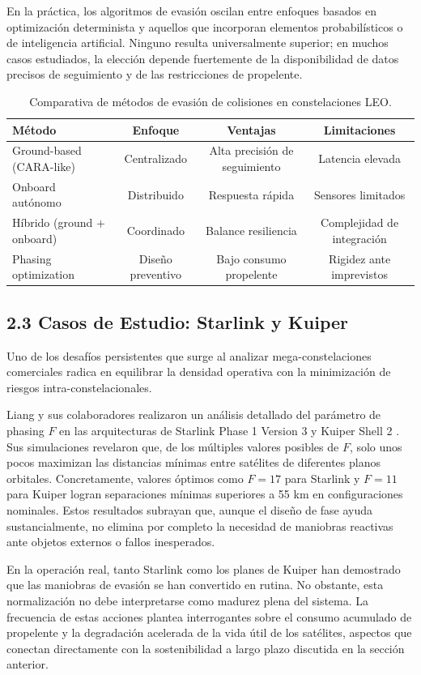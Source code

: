 En la práctica, los algoritmos de evasión oscilan entre enfoques basados en optimización determinista y aquellos que incorporan elementos probabilísticos o de inteligencia artificial. Ninguno resulta universalmente superior; en muchos casos estudiados, la elección depende fuertemente de la disponibilidad de datos precisos de seguimiento y de las restricciones de propelente.

\begin{table}[t]
\centering
\caption{Comparativa de métodos de evasión de colisiones en constelaciones LEO.}
\label{tab:comparativa_evasion}
\begin{tabular}{lccc}
\toprule
Método & Enfoque & Ventajas & Limitaciones \\
\midrule
Ground-based (CARA-like) & Centralizado & Alta precisión de seguimiento & Latencia elevada \\
Onboard autónomo & Distribuido & Respuesta rápida & Sensores limitados \\
Híbrido (ground + onboard) & Coordinado & Balance resiliencia & Complejidad de integración \\
Phasing optimization & Diseño preventivo & Bajo consumo propelente & Rigidez ante imprevistos \\
\bottomrule
\end{tabular}
\end{table}

\subsection{2.3 Casos de Estudio: Starlink y Kuiper}

Uno de los desafíos persistentes que surge al analizar mega-constelaciones comerciales radica en equilibrar la densidad operativa con la minimización de riesgos intra-constelacionales. 

Liang y sus colaboradores realizaron un análisis detallado del parámetro de phasing $F$ en las arquitecturas de Starlink Phase 1 Version 3 y Kuiper Shell 2 \cite{liang2021phasing}. Sus simulaciones revelaron que, de los múltiples valores posibles de $F$, solo unos pocos maximizan las distancias mínimas entre satélites de diferentes planos orbitales. Concretamente, valores óptimos como $F=17$ para Starlink y $F=11$ para Kuiper logran separaciones mínimas superiores a 55 km en configuraciones nominales. Estos resultados subrayan que, aunque el diseño de fase ayuda sustancialmente, no elimina por completo la necesidad de maniobras reactivas ante objetos externos o fallos inesperados.

En la operación real, tanto Starlink como los planes de Kuiper han demostrado que las maniobras de evasión se han convertido en rutina. No obstante, esta normalización no debe interpretarse como madurez plena del sistema. La frecuencia de estas acciones plantea interrogantes sobre el consumo acumulado de propelente y la degradación acelerada de la vida útil de los satélites, aspectos que conectan directamente con la sostenibilidad a largo plazo discutida en la sección anterior.